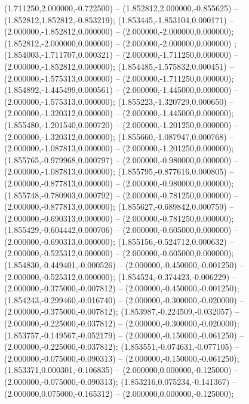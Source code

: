  (1.711250,2.000000,-0.722500) -- (1.852812,2.000000,-0.855625) -- (1.852812,1.852812,-0.853219);
 (1.853445,-1.853104,0.000171) -- (2.000000,-1.852812,0.000000) -- (2.000000,-2.000000,0.000000);
 (1.852812,-2.000000,0.000000) -- (2.000000,-2.000000,0.000000) ;
 (1.854003,-1.711707,0.000321) -- (2.000000,-1.711250,0.000000) -- (2.000000,-1.852812,0.000000);
 (1.854485,-1.575832,0.000451) -- (2.000000,-1.575313,0.000000) -- (2.000000,-1.711250,0.000000);
 (1.854892,-1.445499,0.000561) -- (2.000000,-1.445000,0.000000) -- (2.000000,-1.575313,0.000000);
 (1.855223,-1.320729,0.000650) -- (2.000000,-1.320312,0.000000) -- (2.000000,-1.445000,0.000000);
 (1.855480,-1.201540,0.000720) -- (2.000000,-1.201250,0.000000) -- (2.000000,-1.320312,0.000000);
 (1.855660,-1.087947,0.000768) -- (2.000000,-1.087813,0.000000) -- (2.000000,-1.201250,0.000000);
 (1.855765,-0.979968,0.000797) -- (2.000000,-0.980000,0.000000) -- (2.000000,-1.087813,0.000000);
 (1.855795,-0.877616,0.000805) -- (2.000000,-0.877813,0.000000) -- (2.000000,-0.980000,0.000000);
 (1.855748,-0.780903,0.000792) -- (2.000000,-0.781250,0.000000) -- (2.000000,-0.877813,0.000000);
 (1.855627,-0.689842,0.000759) -- (2.000000,-0.690313,0.000000) -- (2.000000,-0.781250,0.000000);
 (1.855429,-0.604442,0.000706) -- (2.000000,-0.605000,0.000000) -- (2.000000,-0.690313,0.000000);
 (1.855156,-0.524712,0.000632) -- (2.000000,-0.525312,0.000000) -- (2.000000,-0.605000,0.000000);
 (1.854830,-0.449401,-0.000526) -- (2.000000,-0.450000,-0.001250) -- (2.000000,-0.525312,0.000000);
 (1.854524,-0.374423,-0.006229) -- (2.000000,-0.375000,-0.007812) -- (2.000000,-0.450000,-0.001250);
 (1.854243,-0.299460,-0.016740) -- (2.000000,-0.300000,-0.020000) -- (2.000000,-0.375000,-0.007812);
 (1.853987,-0.224509,-0.032057) -- (2.000000,-0.225000,-0.037812) -- (2.000000,-0.300000,-0.020000);
 (1.853757,-0.149567,-0.052179) -- (2.000000,-0.150000,-0.061250) -- (2.000000,-0.225000,-0.037812);
 (1.853551,-0.074631,-0.077105) -- (2.000000,-0.075000,-0.090313) -- (2.000000,-0.150000,-0.061250);
 (1.853371,0.000301,-0.106835) -- (2.000000,0.000000,-0.125000) -- (2.000000,-0.075000,-0.090313);
 (1.853216,0.075234,-0.141367) -- (2.000000,0.075000,-0.165312) -- (2.000000,0.000000,-0.125000);
